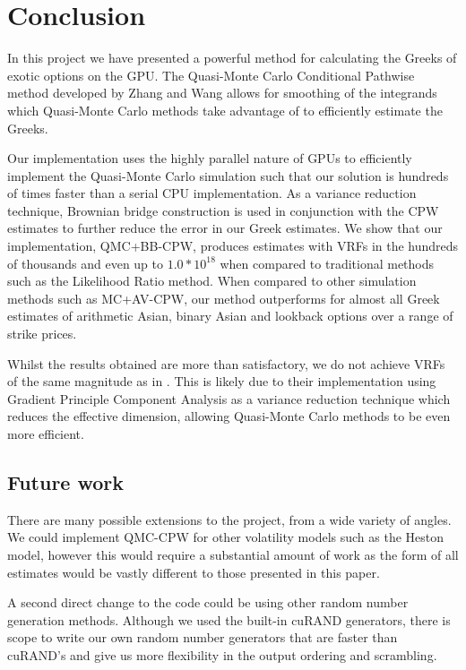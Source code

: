 \chapter{Conclusion} \label{cha:Conclusion}
In this project we have presented a powerful method for calculating the Greeks of exotic options on the GPU. The Quasi-Monte Carlo Conditional Pathwise method developed by Zhang and Wang \cite{ZhangConditionalQuasiMonteCarloMethod} allows for smoothing of the integrands which Quasi-Monte Carlo methods take advantage of to efficiently estimate the Greeks. 

Our implementation uses the highly parallel nature of GPUs to efficiently implement the Quasi-Monte Carlo simulation such that our solution is hundreds of times faster than a serial CPU implementation. As a variance reduction technique, Brownian bridge construction is used in conjunction with the CPW estimates to further reduce the error in our Greek estimates. We show that our implementation, QMC+BB-CPW, produces estimates with VRFs in the hundreds of thousands and even up to $1.0 * 10^{18}$ when compared to traditional methods such as the Likelihood Ratio method. When compared to other simulation methods such as MC+AV-CPW, our method outperforms for almost all Greek estimates of arithmetic Asian, binary Asian and lookback options over a range of strike prices.

Whilst the results obtained are more than satisfactory, we do not achieve VRFs of the same magnitude as in \cite{ZhangConditionalQuasiMonteCarloMethod}. This is likely due to their implementation using Gradient Principle Component Analysis as a variance reduction technique which reduces the effective dimension, allowing Quasi-Monte Carlo methods to be even more efficient.

\section{Future work} \label{sec:FutureWork}
There are many possible extensions to the project, from a wide variety of angles. We could implement QMC-CPW for other volatility models such as the Heston model, however this would require a substantial amount of work as the form of all estimates would be vastly different to those presented in this paper. 

A second direct change to the code could be using other random number generation methods. Although we used the built-in cuRAND generators, there is scope to write our own random number generators that are faster than cuRAND's and give us more flexibility in the output ordering and scrambling. 

